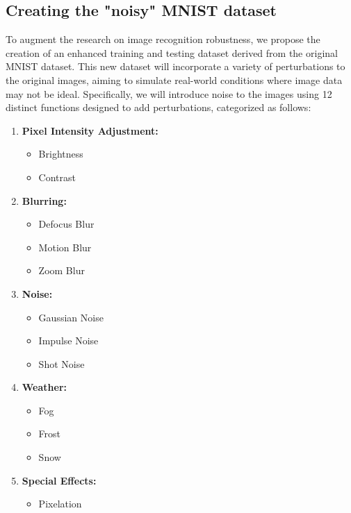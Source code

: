\subsection{Creating the "noisy" MNIST dataset}

To augment the research on image recognition robustness, we propose the creation of an enhanced training and testing dataset derived from the original MNIST dataset. This new dataset will incorporate a variety of perturbations to the original images, aiming to simulate real-world conditions where image data may not be ideal. Specifically, we will introduce noise to the images using 12 distinct functions designed to add perturbations, categorized as follows:

\begin{enumerate}
    \item \textbf{Pixel Intensity Adjustment:}
    \begin{itemize}
        \item Brightness
        \item Contrast
    \end{itemize}
    \item \textbf{Blurring:}
    \begin{itemize}
        \item Defocus Blur
        \item Motion Blur
        \item Zoom Blur
    \end{itemize}
    \item \textbf{Noise:}
    \begin{itemize}
        \item Gaussian Noise
        \item Impulse Noise
        \item Shot Noise
    \end{itemize}
    \item \textbf{Weather:}
    \begin{itemize}
        \item Fog
        \item Frost
        \item Snow
    \end{itemize}
    \item \textbf{Special Effects:}
    \begin{itemize}
        \item Pixelation
    \end{itemize}
\end{enumerate}

